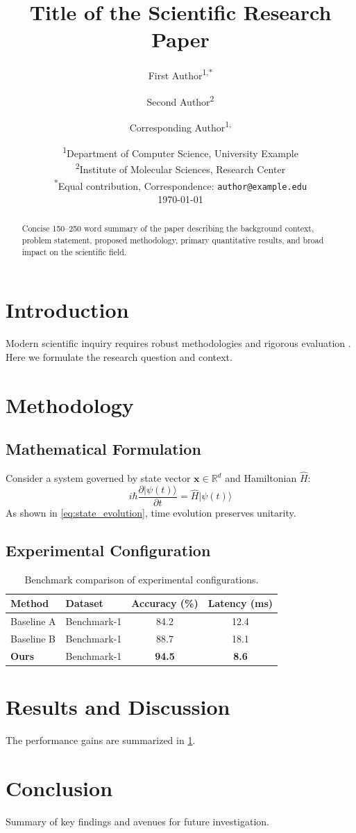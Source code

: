 \documentclass[10pt,twocolumn,letterpaper]{article}
\title{\textbf{Title of the Scientific Research Paper}}
\author{
    First Author\textsuperscript{1,*} \and
    Second Author\textsuperscript{2} \and
    Corresponding Author\textsuperscript{1,\dag}
}
\date{
    \textsuperscript{1}Department of Computer Science, University Example\\
    \textsuperscript{2}Institute of Molecular Sciences, Research Center\\
    \textsuperscript{*}Equal contribution, \textsuperscript{\dag}Correspondence: \texttt{author@example.edu}\\[1ex]
    \today
}
\begin{document}
\maketitle

\begin{abstract}
Concise 150--250 word summary of the paper describing the background context, problem statement, proposed methodology, primary quantitative results, and broad impact on the scientific field.
\end{abstract}

\section{Introduction}
Modern scientific inquiry requires robust methodologies and rigorous evaluation \cite{kucsko2013}. Here we formulate the research question and context.

\section{Methodology}
\subsection{Mathematical Formulation}
Consider a system governed by state vector $\mathbf{x} \in \mathbb{R}^d$ and Hamiltonian $\hat{H}$:
\begin{equation}
\label{eq:state_evolution}
i\hbar \frac{\partial \vert \psi(t) \rangle}{\partial t} = \hat{H} \vert \psi(t) \rangle
\end{equation}
As shown in \cref{eq:state_evolution}, time evolution preserves unitarity.

\subsection{Experimental Configuration}
\begin{table}[h]
\centering
\caption{Benchmark comparison of experimental configurations.}
\label{tab:results}
\begin{tabular}{@{}llcc@{}}
\toprule
\textbf{Method} & \textbf{Dataset} & \textbf{Accuracy (\%)} & \textbf{Latency (ms)} \\
\midrule
Baseline A      & Benchmark-1      & 84.2                   & 12.4 \\
Baseline B      & Benchmark-1      & 88.7                   & 18.1 \\
\textbf{Ours}   & Benchmark-1      & \textbf{94.5}          & \textbf{8.6} \\
\bottomrule
\end{tabular}
\end{table}

\section{Results and Discussion}
The performance gains are summarized in \cref{tab:results}.

\section{Conclusion}
Summary of key findings and avenues for future investigation.



\end{document}
